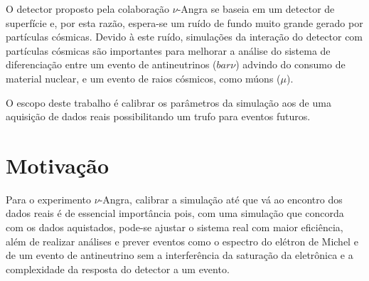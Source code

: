 O detector proposto pela colaboração $\nu$-Angra se baseia em um detector de superfície e, por esta razão, espera-se um ruído de fundo muito grande gerado por partículas cósmicas. Devido à este ruído, simulações da interação do detector com partículas cósmicas são importantes para melhorar a análise do sistema de diferenciação entre um evento de antineutrinos ($bar{\nu}$) advindo do consumo de material nuclear, e um evento de raios cósmicos, como múons ($\mu$). 

O escopo deste trabalho é calibrar os parâmetros da simulação aos de uma aquisição de dados reais possibilitando um trufo para eventos futuros.


%
%
%
%

\section{Motivação} 

Para o experimento $\nu$-Angra, calibrar a simulação até que vá ao encontro dos dados reais é de essencial importância pois, com uma simulação que concorda com os dados aquistados, pode-se ajustar o sistema real com maior eficiência, além de realizar análises e prever eventos como o espectro do elétron de Michel e de um evento de antineutrino sem a interferência da saturação da eletrônica e a complexidade da resposta do detector a um evento. 


